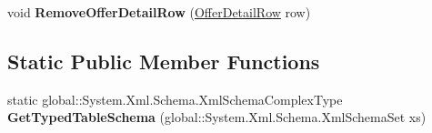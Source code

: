 \begin{DoxyCompactItemize}
\item 
void {\bfseries Remove\+Offer\+Detail\+Row} (\hyperlink{class_products_1_1_data_1_1ds_sage_1_1_offer_detail_row}{Offer\+Detail\+Row} row)\hypertarget{class_products_1_1_data_1_1ds_sage_1_1_offer_detail_data_table_aaef5258b87c3586164baf431086061d1}{}\label{class_products_1_1_data_1_1ds_sage_1_1_offer_detail_data_table_aaef5258b87c3586164baf431086061d1}

\end{DoxyCompactItemize}
\subsection*{Static Public Member Functions}
\begin{DoxyCompactItemize}
\item 
static global\+::\+System.\+Xml.\+Schema.\+Xml\+Schema\+Complex\+Type {\bfseries Get\+Typed\+Table\+Schema} (global\+::\+System.\+Xml.\+Schema.\+Xml\+Schema\+Set xs)\hypertarget{class_products_1_1_data_1_1ds_sage_1_1_offer_detail_data_table_a28e3f41bd3416b14e8b21c801fe1816e}{}\label{class_products_1_1_data_1_1ds_sage_1_1_offer_detail_data_table_a28e3f41bd3416b14e8b21c801fe1816e}

\end{DoxyCompactItemize}
